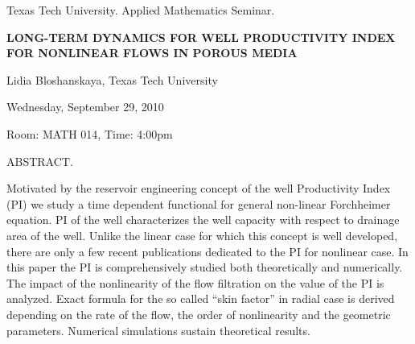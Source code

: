 \documentclass[oneside]{amsart}
\newcommand{\talktitle}{Long-term dynamics for well productivity index for nonlinear flows in porous media}
\newcommand{\talkspeaker}{Lidia Bloshanskaya, Texas Tech University}
\newcommand{\talkdate}{Wednesday, September 29, 2010}
\newcommand{\talkabstract}{
Motivated by the reservoir engineering concept of the well Productivity Index (PI)  we study a time dependent functional for general non-linear Forchheimer equation. PI of the well characterizes the well capacity with respect to drainage area of the well. Unlike the linear case for which this concept is well developed, there are only a few recent publications dedicated to the PI for nonlinear case. In this paper the PI is comprehensively studied both theoretically and numerically. The impact of the nonlinearity of the flow filtration on the value of the PI is analyzed. Exact formula for the so called ``skin factor'' in radial case is derived depending on the rate of the flow, the order of nonlinearity and the geometric parameters. Numerical simulations sustain theoretical results.
}
\begin{document}
\thispagestyle{empty}

\begin{center}
Texas Tech University.  Applied Mathematics Seminar.

\end{center}

\begin{center}

\textbf{\LARGE {\uppercase{\talktitle}} }

\talkspeaker

\talkdate

Room: MATH 014, Time: 4:00pm

\end{center}

ABSTRACT.
\talkabstract
\end{document}
